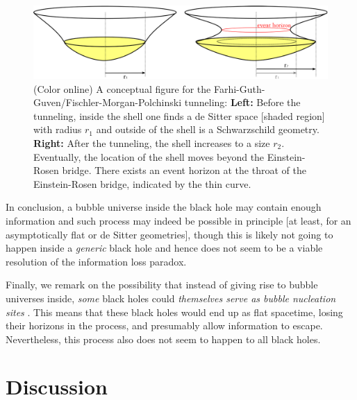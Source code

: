 \documentclass[12pt]{article}
\newcommand{\2}{$^2$}
\newcommand{\3}{$^3$}
\newcommand{\4}{$_4$}
\newcommand{\5}{$_5$}
\begin{document}
\begin{figure}
\begin{center}
\includegraphics[scale=0.4]{FGG_2-eps-converted-to.pdf}
\caption{\label{fig:FGG_2} (Color online) A conceptual figure for the Farhi-Guth-Guven/Fischler-Morgan-Polchinski tunneling: 
\textbf{Left:} Before the tunneling, inside the shell one finds a de Sitter space [shaded region] with radius $r_1$ and outside of the shell is a Schwarzschild geometry. \textbf{Right:} After the tunneling, the shell increases to a size $r_2$. Eventually, the location of the shell moves beyond the Einstein-Rosen bridge. There exists an event horizon at the throat of the Einstein-Rosen bridge, indicated by the thin curve.}
\end{center}
\end{figure}

In conclusion, a bubble universe inside the black hole may contain enough information and such process may indeed be possible in principle [at least, for an asymptotically flat or de Sitter geometries], though this is likely not going to happen inside a \emph{generic} black hole and hence does not seem to be a viable resolution of the information loss paradox.

Finally, we remark on the possibility that instead of giving rise to bubble universes inside, \emph{some} black holes could \emph{themselves serve as bubble nucleation sites} \cite{1401.0017}. This means that these black holes would end up as flat spacetime, losing their horizons in the process, and presumably allow information to escape.  Nevertheless, this process also does not seem to happen to all black holes.



\section{Discussion}\label{discussion}
\end{document}

